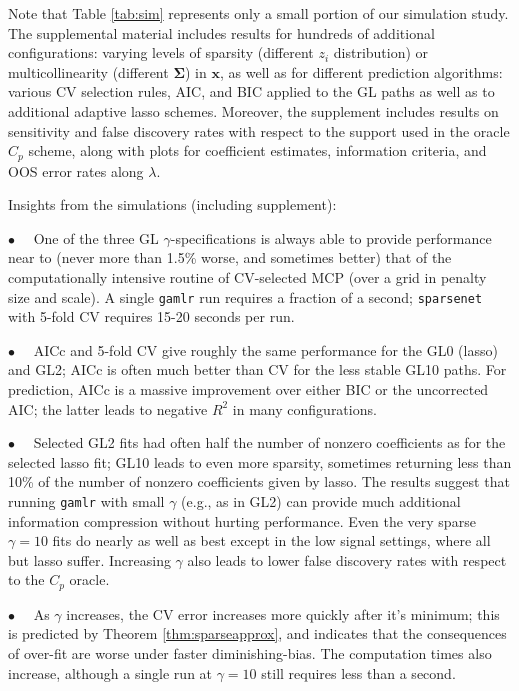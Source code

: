\documentclass[twoside]{article}
\newcommand{\bs}[1]{\boldsymbol{#1}}
\newcommand{\bm}[1]{\mathbf{#1}}
\begin{document}
Note that Table \ref{tab:sim} represents only a small portion of our
simulation study.  The supplemental material includes results for hundreds of
additional configurations: varying levels of sparsity (different $z_i$
distribution) or multicollinearity (different $\bs{\Sigma}$) in $\bm{x}$, as
well as for different prediction algorithms: various CV selection rules, AIC,
and BIC applied to the GL paths as well as to additional adaptive lasso
schemes.  Moreover, the supplement includes results on sensitivity and false
discovery rates with respect to the support used in the oracle $C_p$ scheme,
along with  plots for coefficient estimates, information criteria,
and OOS error rates along $\lambda$.

Insights from the simulations (including supplement):

$\bullet$~~ One of the three GL $\gamma$-specifications is always able to provide performance near to (never more than 1.5\% worse, and sometimes better) that of the computationally intensive routine of CV-selected MCP (over a grid in penalty size and scale).  A single {\tt gamlr} run requires a fraction of a second; {\tt sparsenet} with 5-fold CV requires 15-20 seconds per run.  

$\bullet$~~  AICc and 5-fold CV give roughly the same performance for the GL0 (lasso) and GL2; AICc is often much better than CV for the less stable GL10 paths.  For prediction, AICc is a massive improvement over either BIC or the uncorrected AIC;  the
latter leads to negative $R^2$ in many configurations.

$\bullet$~~  Selected GL2 fits had often half the number of nonzero
coefficients as for the selected lasso fit; GL10 leads to even more sparsity,
sometimes returning less than 10\% of the number of nonzero coefficients given by
lasso.  The results suggest that running {\tt gamlr} with small $\gamma$
(e.g., as in GL2) can provide much additional information compression without
hurting performance.  Even the very sparse $\gamma=10$ fits do nearly as well
as best except in the low signal settings, where all but lasso suffer.
Increasing $\gamma$ also leads to lower false discovery rates with respect to
the $C_p$ oracle.

$\bullet$~~ As $\gamma$ increases, the CV error increases more quickly after
it's minimum; this is predicted by Theorem \ref{thm:sparseapprox}, and indicates that the consequences of over-fit are worse under
faster diminishing-bias. The computation times also increase, although a
single run at $\gamma=10$ still requires less than a second.
\end{document}
